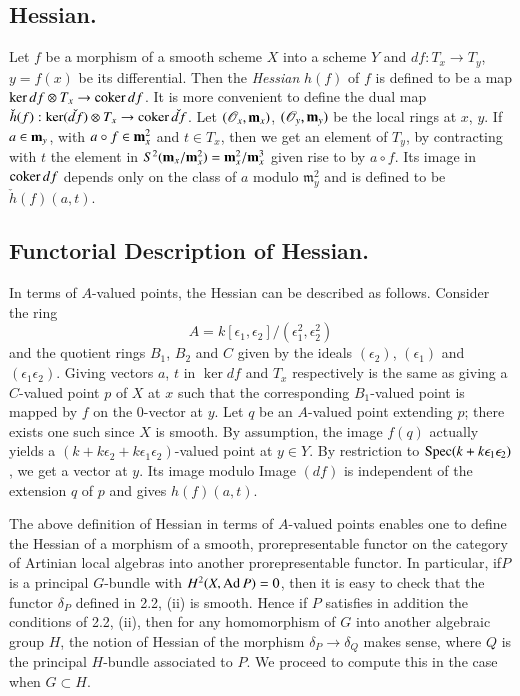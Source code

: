 \setcounter{subsection}{8}
\subsection{Hessian.}\label{art05-sec2.9}
Let $f$ be a morphism of a smooth scheme $X$ into a scheme $Y$ and
$df:T_{x}\to T_{y}$, $y=f(x)$ be its differential. Then the {\em
Hessian} $h(f)$ of $f$ is defined to be a map $\ker df\otimes
T_{x}\to \operatorname{coker} df$. It is more convenient to define the dual map
$\check{h}(f):\ker (\check{df})\otimes
T_{x}\to \operatorname{coker} \check{df}$. Let  $(\mathscr{O}_{x},\mathbf{m}_{x})$,
$(\mathscr{O}_{y},\mathbf{m}_{y})$ be the local rings at $x$, $y$. If
$a\in \mathbf{m}_{y}$, with $a\circ f\in \mathbf{m}^{2}_{x}$ and $t\in T_{x}$,
then we get an element of $T_{y}$, by contracting with $t$ the element
in $S^{2}(\mathbf{m}_{x}/\mathbf{m}^{2}_{x})=\mathbf{m}^{2}_{x}/\mathbf{m}^{3}_{x}$ given rise
to by $a\circ f$. Its image in $\operatorname{coker} df$ depends only on the class
of $a$ modulo $\mathfrak{m}^{2}_{y}$ and is defined to be
$\check{h}(f)(a,t)$. 
 
\subsection{Functorial Description of Hessian.}\label{art05-sec2.10}

In terms of $A$-valued points, the Hessian can be described as
follows. Consider the ring
$$
A=k[\epsilon_{1},\epsilon_{2}]/(\epsilon^{2}_{1},\epsilon^{2}_{2})
$$
and the quotient rings $B_{1}$, $B_{2}$ and $C$ given by the ideals
$(\epsilon_{2})$, $(\epsilon_{1})$ and
$(\epsilon_{1}\epsilon_{2})$. Giving vectors $a$, $t$ in $\ker df$ and
$T_{x}$ respectively is the same as giving a $C$-valued point $p$ of
$X$ at $x$ such that the corresponding $B_{1}$-valued point is mapped
by $f$ on the 0-vector at $y$. Let $q$ be an $A$-valued point
extending $p$; there exists one such since $X$ is smooth. By
assumption, the image $f(q)$ actually yields a
$(k+k\epsilon_{2}+k\epsilon_{1}\epsilon_{2})$-valued point at $y\in
Y$. By restriction to $\operatorname{Spec} (k+k\epsilon_{1}\epsilon_{2})$, we get a
vector at $y$. Its image modulo Image $(df)$ is independent of the
extension $q$ of $p$ and gives $h(f)(a,t)$.

\setcounter{theorem}{10}
\begin{subremark}\label{art05-rem2.11}
The above definition of Hessian in terms of $A$-valued points enables
one to define the Hessian of a morphism of a smooth, prorepresentable
functor on the category of Artinian local algebras into another
prorepresentable functor. In particular, if\pageoriginale $P$ is a
principal $G$-bundle with $H^{2}(X,\operatorname{Ad} P)=0$, then it is easy to check
that the functor $\delta_{P}$ defined in 2.2, (ii) is smooth. Hence if
$P$ satisfies in addition the conditions of 2.2, (ii), then for any
homomorphism of $G$ into another algebraic group $H$, the notion of
Hessian of the morphism $\delta_{P}\to \delta_{Q}$ makes sense, where
$Q$ is the principal $H$-bundle associated to $P$. We proceed to
compute this in the case when $G\subset H$.
\end{subremark}

